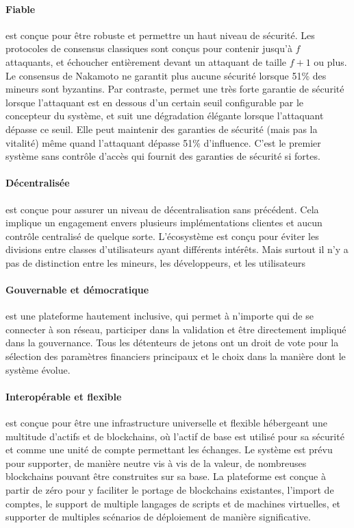 \documentclass[runningheads]{llncs}
\begin{document}
\paragraph{Fiable} \AVAPlatformName{} est conçue pour être robuste et permettre un haut niveau de sécurité. Les
protocoles de consensus classiques sont conçus pour contenir jusqu'à $f$ attaquants, et échoucher entièrement devant
un attaquant de taille $f+1$ ou plus. Le consensus de Nakamoto ne garantit plus aucune sécurité lorsque 51\% des
mineurs sont byzantins. Par contraste, \AVAPlatformName{} permet une très forte garantie de sécurité lorsque l'attaquant
est en dessous d'un certain seuil configurable par le concepteur du système, et suit une dégradation élégante lorsque
l'attaquant dépasse ce seuil. Elle peut maintenir des garanties de sécurité (mais pas la vitalité) même quand
l'attaquant dépasse 51\% d'influence. C'est le premier système sans contrôle d'accès qui fournit des garanties de
sécurité si fortes.

\paragraph{Décentralisée} \AVAPlatformName{} est conçue pour assurer un niveau de décentralisation sans précédent. Cela
implique un engagement envers plusieurs implémentations clientes et aucun contrôle centralisé de quelque sorte.
L'écosystème est conçu pour éviter les divisions entre classes d'utilisateurs ayant différents intérêts. Mais surtout
il n'y a pas de distinction entre les mineurs, les développeurs, et les utilisateurs

\paragraph{Gouvernable et démocratique} \AVAPlatformName{} est une plateforme hautement inclusive, qui permet à
n'importe qui de se connecter à son réseau, participer dans la validation et être directement impliqué dans la
gouvernance. Tous les détenteurs de jetons ont un droit de vote pour la sélection des paramètres financiers principaux
et le choix dans la manière dont le système évolue.

\paragraph{Interopérable et flexible} \AVAPlatformName{} est conçue pour être une infrastructure universelle et flexible
hébergeant une multitude d'actifs et de blockchains, où l'actif de base \AVATokenName{} est utilisé pour sa sécurité
et comme une unité de compte permettant les échanges. Le système est prévu pour supporter, de manière neutre vis à vis
de la valeur, de nombreuses blockchains pouvant être construites sur sa base. La plateforme est conçue à partir de zéro
pour y faciliter le portage de blockchains existantes, l'import de comptes, le support de multiple langages de scripts
et de machines virtuelles, et supporter de multiples scénarios de déploiement de manière significative.
\end{document}

